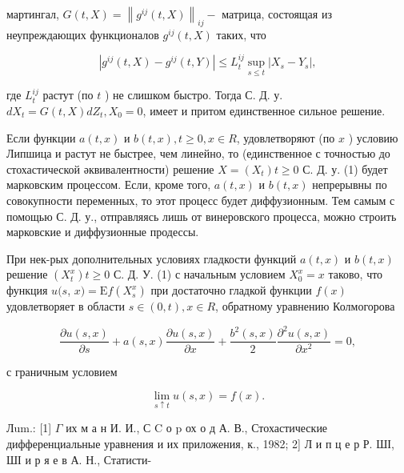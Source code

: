 \documentclass[10pt]{article}
\begin{document}
мартингал, $G(t, X)=\left\|g^{i j}(t, X)\right\|_{i j}-$ матрица, состоящая из неупреждающих функционалов $g^{i j}(t, X)$ таких, что



\[

\left|g^{i j}(t, X)-g^{i j}(t, Y)\right| \leqslant L_{t}^{i j} \sup _{s \leqslant t}\left|X_{s}-Y_{s}\right|,

\]



где $L_{t}^{i j}$ растут (по $t$ ) не слишком быстро. Тогда С. Д. у. $d X_{t}=G(t, X) d Z_{t}, X_{0}=0$, имеет и притом единственное сильное решение.



Если функции $a(t, x)$ и $b(t, x), t \geqslant 0, x \in R$, удовлетворяют (по $x$ ) условию Липшица и растут не быстрее, чем линейно, то (единственное с точностью до стохастической әквивалентности) решение $X=\left(X_{t}\right) t \geqslant 0$ С. Д. у. (1) будет марковским процессом. Если, кроме того, $a(t, x)$ и $b(t, x)$ непрерывны по совокупности переменных, то этот процесс будет диффузионным. Тем самым с помощью С. Д. у., отправляясь лишь от винеровского процесса, можно строить марковские и диффузионные продессы.



При нек-рых дополнительных условиях гладкости функций $a(t, x)$ и $b(t, x)$ решение $\left(X_{t}^{x}\right) t \geqslant 0$ С. Д. У. (1) с начальным условием $X_{0}^{x}=x$ таково, что функция $u(s$, $x)=\mathrm{E} f\left(X_{s}^{x}\right)$ при достаточно гладкой функции $f(x)$ удовлетворяет в области $s \in(0, t), x \in R$, обратному уравнению Колмогорова



\[

\frac{\partial u(s, x)}{\partial s}+a(s, x) \frac{\partial u(s, x)}{\partial x}+\frac{b^{2}(s, x)}{2} \frac{\partial^{2} u(s, x)}{\partial x^{2}}=0,

\]



с граничным условием



\[

\lim _{s \uparrow t} u(s, x)=f(x) .

\]



Лum.: [1] $\Gamma$ их м а н И. И., С $\mathrm{C}$ о $\mathrm{p}$ ох о д А. В., Стохастические дифференциальные уравнения и их приложения, к., 1982; 2] Л и п ц е р Р. ШІ, ШІ и р я е в А. Н., Статисти-
\end{document}
